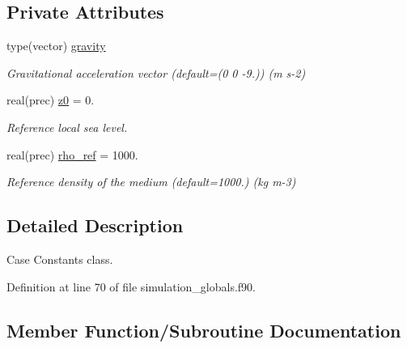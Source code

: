 \subsection*{Private Attributes}
\begin{DoxyCompactItemize}
\item 
type(vector) \mbox{\hyperlink{structsimulation__globals__mod_1_1constants__t_ab1d29ee73044e2bb7b47ca302e2cfdf9}{gravity}}
\begin{DoxyCompactList}\small\item\em Gravitational acceleration vector (default=(0 0 -\/9.)) (m s-\/2) \end{DoxyCompactList}\item 
real(prec) \mbox{\hyperlink{structsimulation__globals__mod_1_1constants__t_a737e824cf720aea683fe23939d12aa5b}{z0}} = 0.
\begin{DoxyCompactList}\small\item\em Reference local sea level. \end{DoxyCompactList}\item 
real(prec) \mbox{\hyperlink{structsimulation__globals__mod_1_1constants__t_a7e4a2bb5206340621bfce6792b527f6d}{rho\+\_\+ref}} = 1000.
\begin{DoxyCompactList}\small\item\em Reference density of the medium (default=1000.) (kg m-\/3) \end{DoxyCompactList}\end{DoxyCompactItemize}


\subsection{Detailed Description}
Case Constants class. 

Definition at line 70 of file simulation\+\_\+globals.\+f90.



\subsection{Member Function/\+Subroutine Documentation}
\mbox{\label{structsimulation__globals__mod_1_1constants__t_a920570af3904fb782a96d3765e314468}} 
